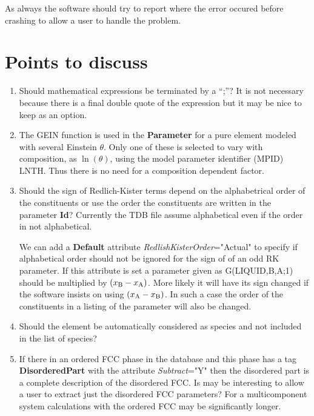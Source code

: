 \documentclass{article}
\begin{document}
As always the software should try to report where the error occured
before crashing to allow a user to handle the problem.

\section{Points to discuss}\label{sec:points}

\begin{enumerate}
\item Should mathematical expressions be terminated by a ``;''?  It is
  not necessary because there is a final double quote of the
  expression but it may be nice to keep as an option.

\item The GEIN function is used in the {\bf Parameter} for a pure
  element modeled with several Einstein $\theta$.  Only one of these
  is selected to vary with composition, as $\ln(\theta)$, using the
  model parameter identifier (MPID) LNTH.  Thus there is no need for a
  composition dependent factor.

\item Should the sign of Redlich-Kister terms depend on the
  alphabetrical order of the constituents or use the order the
  constituents are written in the parameter {\bf Id}?  Currently the
  TDB file assume alphabetical even if the order in not alphabetical.

  We can add a {\bf Default} attribute {\em
    RedlishKisterOrder}="Actual" to specify if alphabetical order
  should not be ignored for the sign of of an odd RK parameter.  If
  this attribute is set a parameter given as G(LIQUID,B,A;1) should be
  multiplied by $(x_{\rm B} - x_{\rm A})$.  More likely it will have
  its sign changed if the software insists on using $(x_{\rm A} -
  x_{\rm B})$.  In such a case the order of the constituents in a
  listing of the parameter will also be changed.

\item Should the element be automatically considered as species and
  not included in the list of species?

\item If there in an ordered FCC phase in the database
  and this phase has a tag {\bf DisorderedPart} with the attribute
  {\em Subtract}="Y" then the disordered part is a complete
  description of the disordered FCC.  Is may be interesting to allow a
  user to extract just the disordered FCC parameters?  For a
  multicomponent system calculations with the ordered FCC may be
  significantly longer.


\end{enumerate}
\end{document}
